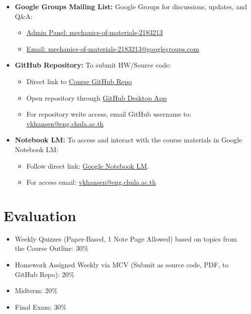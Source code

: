 \documentclass[12pt]{article}
\begin{document}
\begin{enumerate}
\begin{itemize}
    \item \textbf{Google Groups Mailing List:} Google Groups for discussions, updates, and Q\&A:
        \begin{itemize}
            \item \href{https://groups.google.com/g/mechanics-of-materials-2183213}{Admin Panel: mechanics-of-materials-2183213}
            \item \href{mailto:mechanics-of-materials-2183213@googlegroups.com}{Email: mechanics-of-materials-2183213@googlegroups.com}
        \end{itemize}
    \item \textbf{GitHub Repository:} To submit HW/Source code:
        \begin{itemize}
            \item Direct link to \href{https://github.com/vkhansen/Mech_Materials}{Course GitHub Repo}
            \item Open repository through \href{https://desktop.github.com/}{GitHub Desktop App}
            \item For repository write access, email GitHub username to: \href{mailto:vkhansen@eng.chula.ac.th}{vkhansen@eng.chula.ac.th}
        \end{itemize}
    \item \textbf{Notebook LM:} To access and interact with the course materials in Google Notebook LM:
        \begin{itemize}
            \item Follow direct link: \href{https://notebooklm.google.com/notebook/eb161394-bf08-4333-b72a-5e132e2746ff}{Google Notebook LM}.
            \item For access email: \href{mailto:vkhansen@eng.chula.ac.th}{vkhansen@eng.chula.ac.th}
        \end{itemize}
\end{itemize}

\section*{Evaluation}
\begin{itemize}
    \item Weekly Quizzes (Paper-Based, 1 Note Page Allowed) based on topics from the Course Outline: 30\%
    \item Homework Assigned Weekly via MCV (Submit as source code, PDF, to GitHub Repo): 20\%
    \item Midterm: 20\%
    \item Final Exam: 30\%
\end{itemize}


\end{enumerate}
\end{document}
